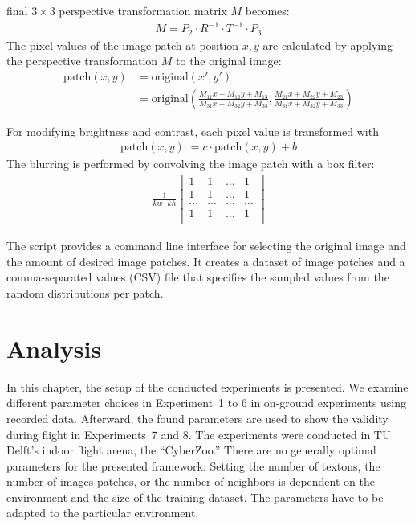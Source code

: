 \documentclass[11pt]{report}
\begin{document}
final $3 \times 3$ perspective transformation matrix $M$ becomes:
\begin{align*}
M =  P_2 \cdot R^{-1} \cdot T^{-1} \cdot P_3
\end{align*}
The pixel values of the image patch at position $x, y$ are calculated
by applying the perspective transformation $M$ to the original image:
\begin{align*}
  \text{patch}(x,y) & = \text{original}(x', y') \\
                    & = \text{original}\left(\frac{M_{11}x + M_{12}y + M_{13}}{M_{31}x + M_{32}y +
  M_{33}}, \frac{M_{21}x + M_{22}y + M_{23}}{M_{31}x + M_{32}y +
  M_{33}}\right)
\end{align*}

For modifying brightness and contrast, each pixel value is transformed
with
\begin{align*}
\text{patch}(x,y) := c \cdot \text{patch}(x,y) + b  
\end{align*}
The blurring is performed by convolving the image patch with a box
filter:
\begin{align*}
  \frac{1}{kw \cdot kh} 
  \begin{bmatrix}
    1 & 1 & \ldots & 1\\
    1 & 1 & \ldots & 1\\
    \ldots & \ldots & \ldots & \ldots\\
    1 & 1 & \ldots & 1\\
  \end{bmatrix}
\end{align*}

The script provides a command line interface for selecting the
original image and the amount of desired image patches. It creates a
dataset of image patches and a comma-separated values (CSV) file that
specifies the sampled values from the random distributions per patch.

\chapter{Analysis}
\label{chap:analysis}
In this chapter, the setup of the conducted experiments is
presented. We examine different parameter choices in Experiment~1 to 6
in on-ground experiments using recorded data. Afterward, the found
parameters are used to show the validity during flight in
Experiments~7 and 8. The experiments were conducted in TU Delft's
indoor flight arena, the ``CyberZoo.''
%
There are no generally optimal parameters for the presented framework:
Setting the number of textons, the number of images patches, or the
number of neighbors is dependent on the environment and the size of the
training dataset. The parameters have to be adapted to the particular
environment.
\end{document}
